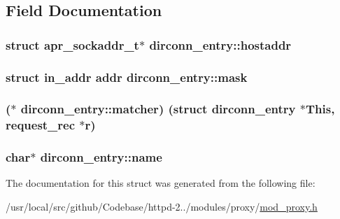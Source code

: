 \subsection{Field Documentation}
\subsubsection[{\texorpdfstring{hostaddr}{hostaddr}}]{\setlength{\rightskip}{0pt plus 5cm}struct {\bf apr\+\_\+sockaddr\+\_\+t}$\ast$ dirconn\+\_\+entry\+::hostaddr}\hypertarget{structdirconn__entry_ae1a538ebabadc0969047f6e7a2dbd880}{}\label{structdirconn__entry_ae1a538ebabadc0969047f6e7a2dbd880}
\subsubsection[{\texorpdfstring{mask}{mask}}]{\setlength{\rightskip}{0pt plus 5cm}struct in\+\_\+addr {\bf addr} dirconn\+\_\+entry\+::mask}\hypertarget{structdirconn__entry_a89e0da84c51df90f9624b74f3858e3cf}{}\label{structdirconn__entry_a89e0da84c51df90f9624b74f3858e3cf}
\subsubsection[{\texorpdfstring{matcher}{matcher}}]{($\ast$ dirconn\+\_\+entry\+::matcher) (struct {\bf dirconn\+\_\+entry} $\ast$This, {\bf request\+\_\+rec} $\ast${\bf r})}\hypertarget{structdirconn__entry_a42e6e388030a0a4464df399287d174ae}{}\label{structdirconn__entry_a42e6e388030a0a4464df399287d174ae}
\subsubsection[{\texorpdfstring{name}{name}}]{\setlength{\rightskip}{0pt plus 5cm}char$\ast$ dirconn\+\_\+entry\+::name}\hypertarget{structdirconn__entry_ac63187ca19d8218bc6437ddc42fe57bc}{}\label{structdirconn__entry_ac63187ca19d8218bc6437ddc42fe57bc}


The documentation for this struct was generated from the following file\+:\begin{DoxyCompactItemize}
\item 
/usr/local/src/github/\+Codebase/httpd-\/2../modules/proxy/\hyperlink{mod__proxy_8h}{mod\+\_\+proxy.\+h}\end{DoxyCompactItemize}
